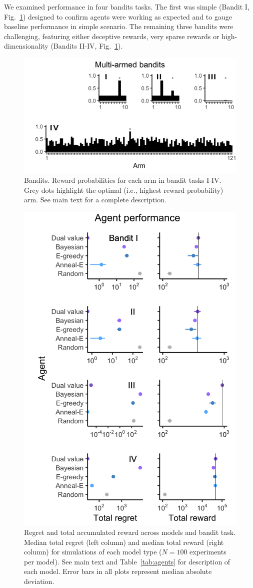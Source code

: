 \documentclass[9pt,lineno]{elife}
\begin{document}
We examined performance in four bandits tasks. The first was simple (Bandit I, Fig.~\ref{fig:f2}) designed to confirm agents were working as expected and to gauge baseline performance in simple scenario. The remaining three bandits were challenging, featuring either deceptive rewards, very sparse rewards or high-dimensionality (Bandits II-IV, Fig.~\ref{fig:f2}).

\begin{figure}
	[tbhp] \centering 
	\includegraphics[width=.7\linewidth]{figures/fig2.png} 
	\caption{ \label{fig:f2} Bandits. Reward probabilities for each arm in bandit tasks I-IV. Grey dots highlight the optimal (i.e., highest reward probability) arm. See main text for a complete description.} 
\end{figure}

\begin{figure}
	[tbhp] \centering 
	\includegraphics[width=.6\linewidth]{figures/fig3.png} 
	\caption{ \label{fig:f3} Regret and total accumulated reward across models and bandit task. Median total regret (left column) and median total reward (right column) for simulations of each model type ($N=100$ experiments per model). See main text and Table~\ref{tab:agents} for description of each model. Error bars in all plots represent median absolute deviation.} 
\end{figure}
\end{document}
